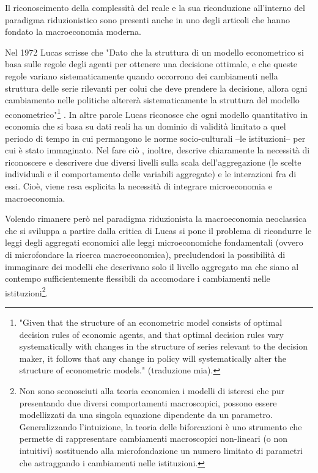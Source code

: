 \documentclass[a4paper, headings=standardclasses]{scrartcl}
\begin{document}
Il riconoscimento della complessità del reale e la sua riconduzione all'interno del paradigma riduzionistico sono presenti anche in uno degli articoli che hanno fondato la macroeconomia moderna.

Nel 1972 Lucas scrisse che "Dato che la struttura di un modello econometrico si basa sulle regole degli agenti per ottenere una decisione ottimale, e che queste regole variano sistematicamente quando occorrono dei cambiamenti nella struttura delle serie rilevanti per colui che deve prendere la decisione, allora ogni cambiamento nelle politiche altererà sistematicamente la struttura del modello econometrico"\footnote{"Given that the structure of an econometric model consists of optimal decision rules of economic agents, and that optimal decision rules vary systematically with changes in the structure of series relevant to the decision maker, it follows that any change in policy will systematically alter the structure of econometric models." (traduzione mia).} \parencite{lucas1976}.
In altre parole Lucas riconosce che ogni modello quantitativo in economia che si basa su dati reali ha un dominio di validità limitato a quel periodo di tempo in cui permangono le norme socio-culturali --le istituzioni-- per cui è stato immaginato.
Nel fare ciò , inoltre, descrive chiaramente la necessità di riconoscere e descrivere due diversi livelli sulla scala dell'aggregazione (le scelte individuali e il comportamento delle variabili aggregate) e le interazioni fra di essi. Cioè, viene resa esplicita la necessità di integrare microeconomia e macroeconomia.

Volendo rimanere però nel paradigma riduzionista la macroeconomia neoclassica che si sviluppa a partire dalla critica di Lucas si pone il problema di ricondurre le leggi degli aggregati economici alle leggi microeconomiche fondamentali (ovvero di microfondare la ricerca macroeconomica), precludendosi la possibilità di immaginare dei modelli che descrivano solo il livello aggregato ma che siano al contempo sufficientemente flessibili da accomodare i cambiamenti nelle istituzioni\footnote{Non sono sconosciuti alla teoria economica i modelli di isteresi che pur presentando due diversi comportamenti macroscopici, possono essere modellizzati da una singola equazione dipendente da un parametro. Generalizzando l'intuizione, la teoria delle biforcazioni è uno strumento che permette di rappresentare cambiamenti macroscopici non-lineari (o non intuitivi) sostituendo alla microfondazione un numero limitato di parametri che astraggando i cambiamenti nelle istituzioni.}.
\end{document}
